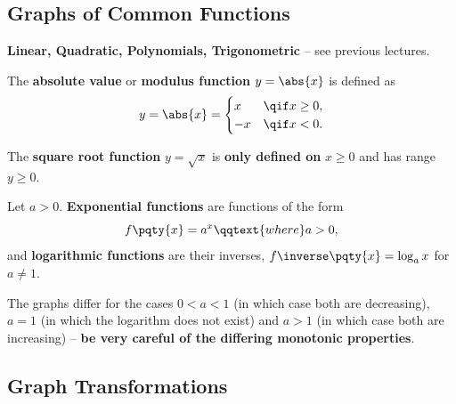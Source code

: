 \documentclass{article}
\begin{document}
\subsection{Graphs of Common Functions}

\textbf{Linear, Quadratic, Polynomials, Trigonometric} -- see previous lectures.

The \textbf{absolute value} or \textbf{modulus function} \(y = \abs{x}\) is defined as
\[
    y = \abs{x} = \begin{cases}
        x & \qif x \geq 0, \\
        -x & \qif x < 0.
    \end{cases}
\]

The \textbf{square root function} \(y = \sqrt{x}\) is \textbf{only defined on} \(x \geq 0\) and has range \(y \geq 0\).

Let \(a > 0\). \textbf{Exponential functions} are functions of the form
\[
    f\pqty{x} = a^x \qqtext{where} a > 0,
\]
and \textbf{logarithmic functions} are their inverses, \(f\inverse\pqty{x} = \log_a x\) for \(a \neq 1\).

The graphs differ for the cases \(0 < a < 1\) (in which case both are decreasing), \(a = 1\) (in which the logarithm does not exist) and \(a > 1\) (in which case both are increasing) -- \textbf{be very careful of the differing monotonic properties}.

\subsection{Graph Transformations}
\end{document}
